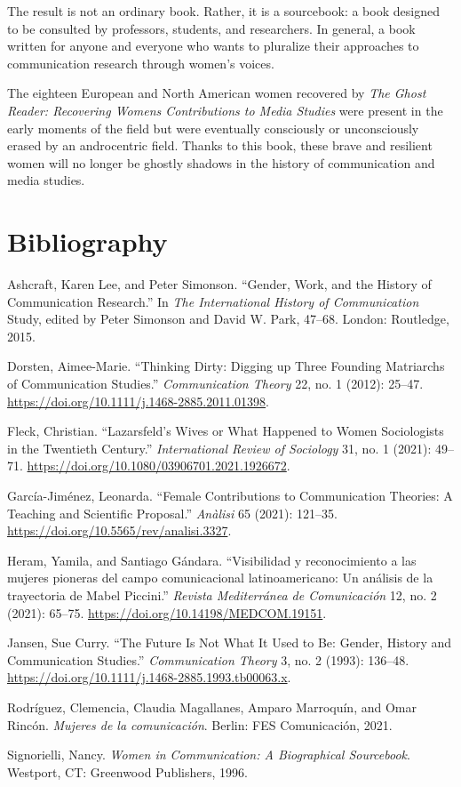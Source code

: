 \documentclass{tufte-handout}
\begin{document}
The result is not an ordinary book. Rather, it is a sourcebook: a book
designed to be consulted by professors, students, and researchers. In
general, a book written for anyone and everyone who wants to pluralize
their approaches to communication research through women's voices.

\newpage The eighteen European and North American women recovered by \emph{The
Ghost Reader: Recovering Women\textquotesingle s Contributions to Media
Studies} were present in the early moments of the field but were
eventually consciously or unconsciously erased by an androcentric field.
Thanks to this book, these brave and resilient women will no longer be
ghostly shadows in the history of communication and media studies.




\section{Bibliography}\label{bibliography}

\begin{hangparas}{.25in}{1} 



Ashcraft, Karen Lee, and Peter Simonson. ``Gender, Work, and the History
of Communication Research.'' In \emph{The International History of
Communication} Study, edited by Peter Simonson and David W. Park,
47--68. London: Routledge, 2015.

Dorsten, Aimee-Marie. ``Thinking Dirty: Digging up Three Founding
Matriarchs of Communication Studies.'' \emph{Communication Theory} 22,
no. 1 (2012): 25--47.
\url{https://doi.org/10.1111/j.1468-2885.2011.01398}.

Fleck, Christian. ``Lazarsfeld's Wives or What Happened to Women
Sociologists in the Twentieth Century.'' \emph{International Review of
Sociology} 31, no. 1 (2021): 49--71.
\url{https://doi.org/10.1080/03906701.2021.1926672}.

García-Jiménez, Leonarda. ``Female Contributions to Communication
Theories: A Teaching and Scientific Proposal.'' \emph{Anàlisi} 65
(2021): 121--35. \url{https://doi.org/10.5565/rev/analisi.3327}.

Heram, Yamila, and Santiago Gándara. ``Visibilidad y reconocimiento a
las mujeres pioneras del campo comunicacional latinoamericano: Un
análisis de la trayectoria de Mabel Piccini.'' \emph{Revista
Mediterránea de Comunicación} 12, no. 2 (2021): 65--75.
\url{https://doi.org/10.14198/MEDCOM.19151}.

Jansen, Sue Curry. ``The Future Is Not What It Used to Be: Gender,
History and Communication Studies.'' \emph{Communication Theory} 3, no.
2 (1993): 136--48.
\url{https://doi.org/10.1111/j.1468-2885.1993.tb00063.x}.

Rodríguez, Clemencia, Claudia Magallanes, Amparo Marroquín, and Omar
Rincón. \emph{Mujeres de la comunicación}. Berlin: FES Comunicación,
2021.

Signorielli, Nancy. \emph{Women in Communication: A Biographical
Sourcebook}. Westport, CT: Greenwood Publishers, 1996.



\end{hangparas}
\end{document}
